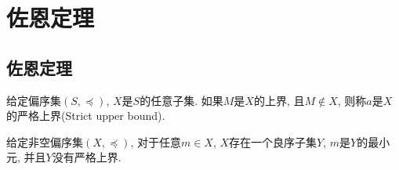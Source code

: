 \chapter{佐恩定理}
\section{佐恩定理}
\begin{definition}
	给定偏序集$(S,\preccurlyeq)$, $X$是$S$的任意子集. 如果$M$是$X$的上界, 且$M\notin X$, 则称$a$是$X$的严格上界(Strict upper bound).
\end{definition}

\begin{lemma}
	\label{2.4.1}
	给定非空偏序集$(X,\preccurlyeq)$, 对于任意$m\in X$, $X$存在一个良序子集$Y$, $m$是$Y$的最小元, 并且$Y$没有严格上界.
\end{lemma}

